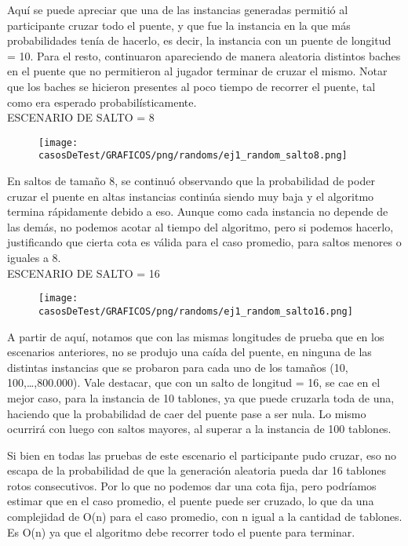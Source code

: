 Aquí se puede apreciar que una de las instancias generadas permitió al participante cruzar todo el puente, y que fue la instancia en la que más probabilidades tenía de hacerlo, es decir, la instancia con un puente de longitud = 10. Para el resto, continuaron apareciendo de manera aleatoria distintos baches en el puente que no permitieron al jugador terminar de cruzar el mismo. Notar que los baches se hicieron presentes al poco tiempo de recorrer el puente, tal como era esperado probabilísticamente.\\

\newpage \indent ESCENARIO DE SALTO = 8
	\begin{figure}[h]
		\begin{center}
		   \texttt{[image: casosDeTest/GRAFICOS/png/randoms/ej1\_random\_salto8.png]}
		\end{center}
	\end{figure}

En saltos de tamaño 8, se continuó observando que la probabilidad de poder cruzar el puente en altas instancias continúa siendo muy baja y el algoritmo termina rápidamente debido a eso.  Aunque como cada instancia no depende de las demás, no podemos acotar al tiempo del algoritmo, pero si podemos hacerlo, justificando que cierta cota es válida para el caso promedio, para saltos menores o iguales a 8.\\

\indent ESCENARIO DE SALTO = 16
	\begin{figure}[h]
		\begin{center}
		   \texttt{[image: casosDeTest/GRAFICOS/png/randoms/ej1\_random\_salto16.png]}
		\end{center}
	\end{figure}

A partir de aquí, notamos que con las mismas longitudes de prueba que en los escenarios anteriores, no se produjo una caída del puente, en ninguna de las distintas instancias que se probaron para cada uno de los tamaños (10, 100,…,800.000). Vale destacar, que con un salto de longitud = 16, se cae en el mejor caso, para la instancia de 10 tablones, ya que puede cruzarla toda de una, haciendo que la probabilidad de caer del puente pase a ser nula. Lo mismo ocurrirá con luego con saltos mayores, al superar a la instancia de 100 tablones.

Si bien en todas las pruebas de este escenario el participante pudo cruzar, eso no escapa de la probabilidad de que la generación aleatoria pueda dar 16 tablones rotos consecutivos. Por lo que no podemos dar una cota fija, pero podríamos estimar que en el caso promedio, el puente puede ser cruzado, lo que da una complejidad de O(n) para el caso promedio, con n igual a la cantidad de tablones.
Es O(n) ya que el algoritmo debe recorrer todo el puente para terminar.\\

